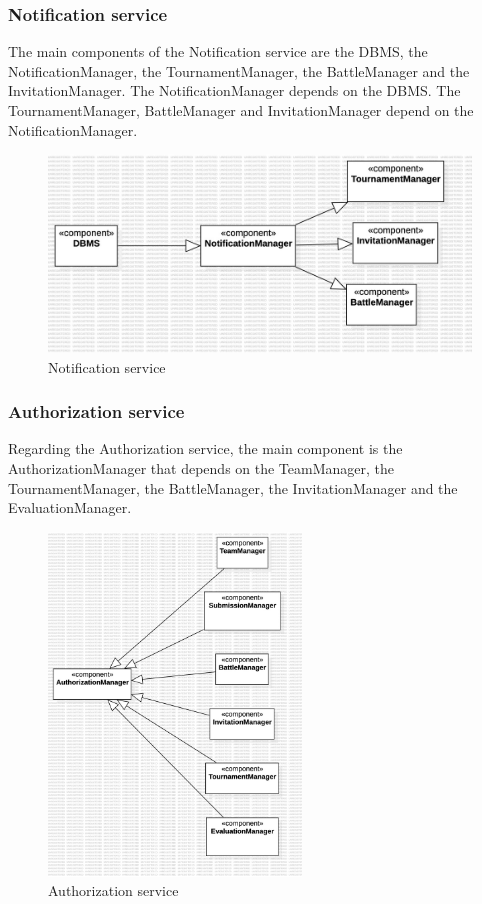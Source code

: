 \subsubsection*{Notification service}
The main components of the Notification service are the DBMS, the NotificationManager, the TournamentManager, the BattleManager and the InvitationManager. The NotificationManager depends on the DBMS. The TournamentManager, BattleManager and InvitationManager depend on the NotificationManager.
\begin{figure}[H]
    \centering
    \includegraphics[width=\textwidth]{Diagrams/NotificationIntegrationPlan.jpg}
    \caption{Notification service}
    \label{fig:notification}
\end{figure}
\clearpage
\subsubsection*{Authorization service}
Regarding the Authorization service, the main component is the AuthorizationManager that depends on the TeamManager, the TournamentManager, the BattleManager, the InvitationManager and the EvaluationManager.
\begin{figure}[H]
    \centering
    \includegraphics[width=0.6\textwidth]{Diagrams/AuthorizationIntegrationPlan.jpg}
    \caption{Authorization service}
    \label{fig:authorization}
\end{figure}
\clearpage
